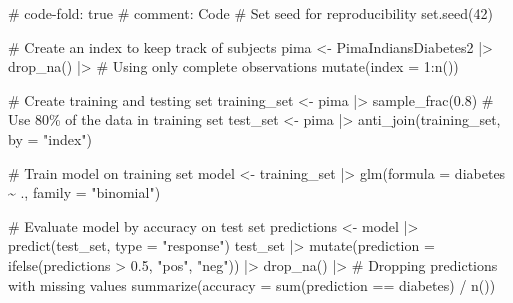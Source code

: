 \documentclass[
  letterpaper,
  DIV=11,
  numbers=noendperiod]{scrreprt}
\newenvironment{Shaded}{\begin{snugshade}}{\end{snugshade}}
\newcommand{\AttributeTok}[1]{\textcolor[rgb]{0.40,0.45,0.13}{#1}}
\newcommand{\CommentTok}[1]{\textcolor[rgb]{0.37,0.37,0.37}{#1}}
\newcommand{\DecValTok}[1]{\textcolor[rgb]{0.68,0.00,0.00}{#1}}
\newcommand{\FloatTok}[1]{\textcolor[rgb]{0.68,0.00,0.00}{#1}}
\newcommand{\FunctionTok}[1]{\textcolor[rgb]{0.28,0.35,0.67}{#1}}
\newcommand{\NormalTok}[1]{\textcolor[rgb]{0.00,0.23,0.31}{#1}}
\newcommand{\OtherTok}[1]{\textcolor[rgb]{0.00,0.23,0.31}{#1}}
\newcommand{\SpecialCharTok}[1]{\textcolor[rgb]{0.37,0.37,0.37}{#1}}
\newcommand{\StringTok}[1]{\textcolor[rgb]{0.13,0.47,0.30}{#1}}
\begin{document}
\begin{Shaded}
\begin{Highlighting}[]
\CommentTok{\# code{-}fold: true}
\CommentTok{\# comment: Code}
\CommentTok{\# Set seed for reproducibility}
\FunctionTok{set.seed}\NormalTok{(}\DecValTok{42}\NormalTok{) }

\CommentTok{\# Create an index to keep track of subjects}
\NormalTok{pima }\OtherTok{\textless{}{-}}\NormalTok{ PimaIndiansDiabetes2 }\SpecialCharTok{|\textgreater{}} 
  \FunctionTok{drop\_na}\NormalTok{() }\SpecialCharTok{|\textgreater{}} \CommentTok{\# Using only complete observations}
  \FunctionTok{mutate}\NormalTok{(}\AttributeTok{index =} \DecValTok{1}\SpecialCharTok{:}\FunctionTok{n}\NormalTok{())}

\CommentTok{\# Create training and testing set}
\NormalTok{training\_set }\OtherTok{\textless{}{-}}\NormalTok{ pima }\SpecialCharTok{|\textgreater{}} 
  \FunctionTok{sample\_frac}\NormalTok{(}\FloatTok{0.8}\NormalTok{) }\CommentTok{\# Use 80\% of the data in training set}
\NormalTok{test\_set }\OtherTok{\textless{}{-}}\NormalTok{ pima }\SpecialCharTok{|\textgreater{}} 
  \FunctionTok{anti\_join}\NormalTok{(training\_set, }\AttributeTok{by =} \StringTok{"index"}\NormalTok{)}

\CommentTok{\# Train model on training set}
\NormalTok{model }\OtherTok{\textless{}{-}}\NormalTok{ training\_set }\SpecialCharTok{|\textgreater{}} 
  \FunctionTok{glm}\NormalTok{(}\AttributeTok{formula =}\NormalTok{ diabetes }\SpecialCharTok{\textasciitilde{}}\NormalTok{ ., }\AttributeTok{family =} \StringTok{"binomial"}\NormalTok{)}

\CommentTok{\# Evaluate model by accuracy on test set}
\NormalTok{predictions }\OtherTok{\textless{}{-}}\NormalTok{ model }\SpecialCharTok{|\textgreater{}} 
  \FunctionTok{predict}\NormalTok{(test\_set, }\AttributeTok{type =} \StringTok{"response"}\NormalTok{)}
\NormalTok{test\_set }\SpecialCharTok{|\textgreater{}} 
  \FunctionTok{mutate}\NormalTok{(}\AttributeTok{prediction =} \FunctionTok{ifelse}\NormalTok{(predictions }\SpecialCharTok{\textgreater{}} \FloatTok{0.5}\NormalTok{, }\StringTok{"pos"}\NormalTok{, }\StringTok{"neg"}\NormalTok{)) }\SpecialCharTok{|\textgreater{}} 
  \FunctionTok{drop\_na}\NormalTok{() }\SpecialCharTok{|\textgreater{}} \CommentTok{\# Dropping predictions with missing values}
  \FunctionTok{summarize}\NormalTok{(}\AttributeTok{accuracy =} \FunctionTok{sum}\NormalTok{(prediction }\SpecialCharTok{==}\NormalTok{ diabetes) }\SpecialCharTok{/} \FunctionTok{n}\NormalTok{())}
\end{Highlighting}
\end{Shaded}
\end{document}
